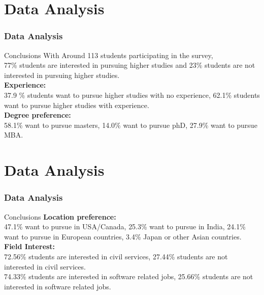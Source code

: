 \documentclass{beamer}
\begin{document}
\section{Data Analysis}
\begin{frame}
  \frametitle{Data Analysis}
  \begin{block}{Conclusions}
    With Around 113 students participating in the survey,\\ 77\% students are interested in pursuing higher studies and 23\% students are not interested in pursuing higher studies.\\
    {\textbf{Experience:}}\\
    37.9 \% students want to pursue higher studies with no experience, 62.1\% students want to pursue higher studies with experience.\\
    {\textbf{Degree preference:}}\\
    58.1\% want to pursue masters, 14.0\% want to pursue phD, 27.9\% want to pursue MBA.\\
  \end{block}
\end{frame}

\section{Data Analysis}
\begin{frame}
  \frametitle{Data Analysis}
  \begin{block}{Conclusions}
    {\textbf{Location preference:}}\\
    47.1\% want to pursue in USA/Canada, 25.3\% want to pursue in India, 24.1\% want to pursue in European countries, 3.4\% Japan or other Asian countries.\\
    {\textbf{Field Interest:}}\\
    72.56\% students are interested in civil services, 27.44\% students are not interested in civil services.\\
    74.33\% students are interested in software related jobs, 25.66\% students are not interested in software related jobs.
  \end{block}
\end{frame}
\end{document}

